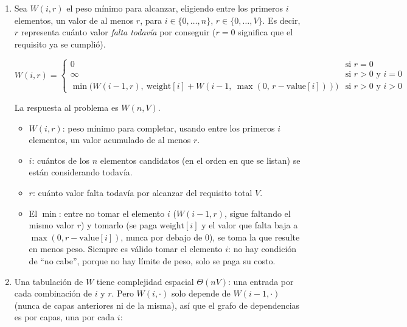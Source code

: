 \begin{enumerate}
  \item Sea $W(i,r)$ el peso mínimo para alcanzar, eligiendo entre los primeros $i$ elementos, un valor de al menos $r$, para $i \in \{0,\ldots,n\}$, $r \in \{0,\ldots,V\}$. Es decir, $r$ representa cuánto valor \emph{falta todavía} por conseguir ($r=0$ significa que el requisito ya se cumplió).

  \[
  W(i,r) =
  \begin{cases}
  0 & \text{si } r = 0 \\
  \infty & \text{si } r > 0 \text{ y } i = 0 \\
  \min\big(W(i-1,r),\ \text{weight}[i] + W(i-1,\ \max(0,\, r-\text{value}[i]))\big) & \text{si } r > 0 \text{ y } i > 0
  \end{cases}
  \]

  La respuesta al problema es $W(n,V)$.

  \begin{itemize}
    \item $W(i,r)$: peso mínimo para completar, usando entre los primeros $i$ elementos, un valor acumulado de al menos $r$.
    \item $i$: cuántos de los $n$ elementos candidatos (en el orden en que se listan) se están considerando todavía.
    \item $r$: cuánto valor falta todavía por alcanzar del requisito total $V$.
    \item El $\min$: entre no tomar el elemento $i$ ($W(i-1,r)$, sigue faltando el mismo valor $r$) y tomarlo (se paga $\text{weight}[i]$ y el valor que falta baja a $\max(0, r-\text{value}[i])$, nunca por debajo de $0$), se toma la que resulte en menos peso. Siempre es válido tomar el elemento $i$: no hay condición de ``no cabe'', porque no hay límite de peso, solo se paga su costo.
  \end{itemize}

  \pagebreak

  \item Una tabulación de $W$ tiene complejidad espacial $\Theta(nV)$: una entrada por cada combinación de $i$ y $r$. Pero $W(i,\cdot)$ solo depende de $W(i-1,\cdot)$ (nunca de capas anteriores ni de la misma), así que el grafo de dependencias es por capas, una por cada $i$:

\begin{center}
\end{center}
\end{enumerate}
